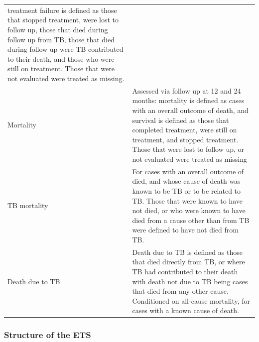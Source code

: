 \documentclass[11pt,twoside]{bristolthesis}
\begin{document}
\begin{longtable}[]{@{}ll@{}}
\begin{minipage}[t]{0.62\columnwidth}
  treatment failure is defined as those that stopped
  treatment, were lost to follow up, those that died
  during follow up from TB, those that died during
  follow up were TB contributed to their death, and
  those who were still on treatment. Those that were
  not evaluated were treated as missing.\strut
  \end{minipage}\tabularnewline
  \begin{minipage}[t]{0.33\columnwidth}\raggedright
  Mortality\strut
  \end{minipage} & \begin{minipage}[t]{0.62\columnwidth}\raggedright
  Assessed via follow up at 12 and 24 months:
  mortality is defined as cases with an overall
  outcome of death, and survival is defined as those
  that completed treatment, were still on treatment,
  and stopped treatment. Those that were lost to
  follow up, or not evaluated were treated as
  missing\strut
  \end{minipage}\tabularnewline
  \begin{minipage}[t]{0.33\columnwidth}\raggedright
  TB mortality\strut
  \end{minipage} & \begin{minipage}[t]{0.62\columnwidth}\raggedright
  For cases with an overall outcome of died, and
  whose cause of death was known to be TB or to be
  related to TB. Those that were known to have not
  died, or who were known to have died from a cause
  other than from TB were defined to have not died
  from TB.\strut
  \end{minipage}\tabularnewline
  \begin{minipage}[t]{0.33\columnwidth}\raggedright
  Death due to TB\strut
  \end{minipage} & \begin{minipage}[t]{0.62\columnwidth}\raggedright
  Death due to TB is defined as those that died
  directly from TB, or where TB had contributed to
  their death with death not due to TB being cases
  that died from any other cause. Conditioned on
  all-cause mortality, for cases with a known cause
  of death.\strut
  \end{minipage}\tabularnewline
  \bottomrule
  \end{longtable}
  \hypertarget{structure-of-the-ets}{%
  \subsubsection{Structure of the ETS}\label{structure-of-the-ets}}
  
\end{document}
